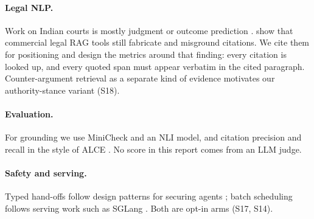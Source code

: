 \paragraph{Legal NLP.} Work on Indian courts is mostly judgment or outcome prediction \citep{nigam2025nyayarag,nigam2024predex}. \citet{magesh2025} show that commercial legal RAG tools still fabricate and misground citations. We cite them for positioning and design the metrics around that finding: every citation is looked up, and every quoted span must appear verbatim in the cited paragraph. Counter-argument retrieval as a separate kind of evidence \citep{wachsmuth2018} motivates our authority-stance variant (S18).

\paragraph{Evaluation.} For grounding we use MiniCheck \citep{tang2024minicheck} and an NLI model, and citation precision and recall in the style of ALCE \citep{gao2023alce}. No score in this report comes from an LLM judge.

\paragraph{Safety and serving.} Typed hand-offs follow design patterns for securing agents \citep{beurerkellner2025patterns}; batch scheduling follows serving work such as SGLang \citep{zheng2024sglang}. Both are opt-in arms (S17, S14).
